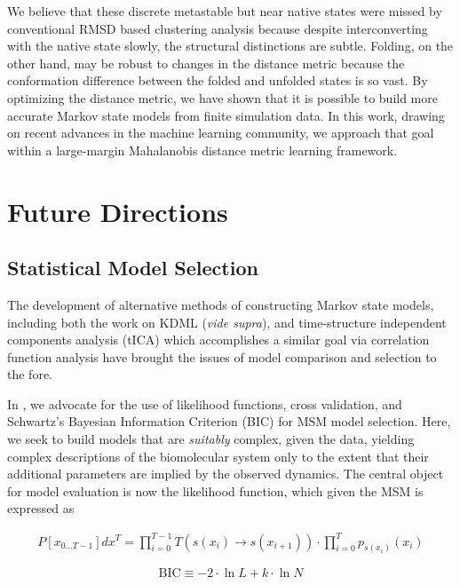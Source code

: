 \documentclass[twocolumn,floatfix,nofootinbib,aps]{revtex4-1}
\begin{document}
We believe that these discrete metastable but near native states were missed by conventional RMSD based clustering analysis because despite interconverting with the native state slowly, the structural distinctions are subtle. Folding, on the other hand, may be robust to changes in the distance metric because the conformation difference between the folded and unfolded states is so vast. By optimizing the distance metric, we have shown that it is possible to build more accurate Markov state models from finite simulation data. In this work, drawing on recent advances in the machine learning community, we approach that goal within a large-margin Mahalanobis distance metric learning framework.

\section{Future Directions}

\subsection{Statistical Model Selection}
The development of alternative methods of constructing Markov state models, including both the work on KDML (\emph{vide supra}), and time-structure independent components analysis (tICA) which accomplishes a similar goal via correlation function analysis\cite{Schwantes2013Improvements} have brought the issues of model comparison and selection to the fore.
 
In \textcite{Schwantes2013Optimal}, we advocate for the use of likelihood functions, cross validation, and Schwartz's Bayesian Information Criterion (BIC)\cite{Schwartz78Estimating} for MSM model selection. Here, we seek to build models that are \emph{suitably} complex, given the data, yielding complex descriptions of the biomolecular system only to the extent that their additional parameters are implied by the observed dynamics. The central object for model evaluation is now the likelihood function, which given the MSM is expressed as 

\begin{align}
P[x_{0...T-1}] dx^T = \prod_{i=0}^{T-1} T(s(x_i) \rightarrow s(x_{i+1})) \cdot \prod_{i=0}^{T} p_{s(x_i)}(x_{i})
\label{eq:like}
\end{align}

\begin{equation}
\label{eq:bic}
\mathrm{BIC} \equiv -2\cdot \ln L + k \cdot \ln N
\end{equation}
\end{document}
